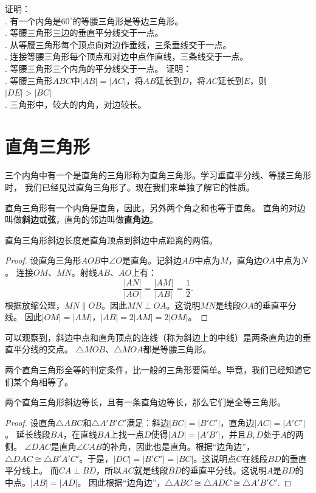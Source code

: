 \documentclass[12pt,UTF8,fontset=none]{ctexbook}
\begin{document}
\begin{xt}\label{xt:4-0-0}
    证明：\\
    . 有一个内角是$60^\circ$的等腰三角形是等边三角形。\\
    . 等腰三角形三边的垂直平分线交于一点。\\
    . 从等腰三角形每个顶点向对边作垂线，三条垂线交于一点。\\
    . 连接等腰三角形每个顶点和对边中点作直线，三条线交于一点。\\
    . 等腰三角形三个内角的平分线交于一点。
    证明： \\
    . 等腰三角形$ABC$中$|AB| = |AC|$，将$AB$延长到$D$，将$AC$延长到$E$，则$|DE| > |BC|$\\
    . 三角形中，较大的内角，对边较长。
\end{xt}

\section{直角三角形}
三个内角中有一个是直角的三角形称为直角三角形。学习垂直平分线、等腰三角形时，
我们已经见过直角三角形了。现在我们来单独了解它的性质。

直角三角形有一个内角是直角，因此，另外两个角之和也等于直角。
直角的对边叫做\textbf{斜边}或\textbf{弦}，直角的邻边叫做\textbf{直角边}。

\begin{tm}\label{tm:4-1-0}
    直角三角形斜边长度是直角顶点到斜边中点距离的两倍。
\end{tm}
\begin{proof}
    设直角三角形$AOB$中$\angle O$是直角。记斜边$AB$中点为$M$，直角边$OA$中点为$N$。
    连接$OM$、$MN$。射线$AB$、$AO$上有：
    $$ \frac{|AN|}{|AO|} = \frac{|AM|}{|AB|} = \frac12.$$
    根据放缩公理，$MN \parallel OB$。因此$MN \perp OA$。这说明$MN$是线段$OA$的垂直平分线。
    因此$|OM| = |AM|$，$|AB| = 2|AM| = 2|OM|$。
\end{proof}

可以观察到，斜边中点和直角顶点的连线（称为斜边上的中线）是两条直角边的垂直平分线的交点。
$\triangle MOB$、$\triangle MOA$都是等腰三角形。

两个直角三角形全等的判定条件，比一般的三角形要简单。毕竟，我们已经知道它们某个角相等了。

\begin{tm}\label{tm:4-1-1}
    两个直角三角形斜边等长，且有一条直角边等长，那么它们是全等三角形。
\end{tm}
\begin{proof}
    设直角$\triangle ABC$和$\triangle A'B'C'$满足：斜边$|BC| = |B'C'|$，直角边$|AC| = |A'C'|$。
    延长线段$BA$，在直线$BA$上找一点$D$使得$|AD| = |A'B'|$，并且$B,D$处于$A$的两侧。
    $\angle DAC$是直角$\angle CAB$的补角，因此也是直角。根据“边角边”，
    $\triangle DAC \cong \triangle B'A'C'$。于是，$|DC| = |B'C'| = |BC|$。这说明点$C$在线段$BD$的垂直平分线上。
    而$CA \perp BD$，所以$AC$就是线段$BD$的垂直平分线。这说明$A$是$BD$的中点。$|AB| = |AD|$。
    因此根据“边角边”，$\triangle ABC \cong \triangle ADC \cong \triangle A'B'C'.$
\end{proof}
\end{document}
